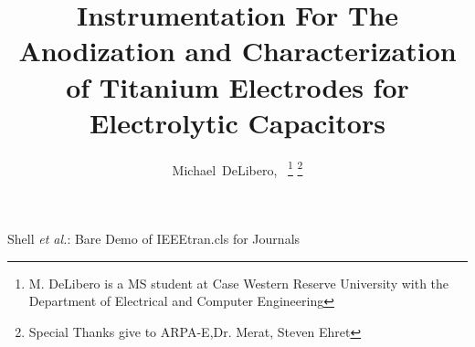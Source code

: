 \documentclass[journal]{./IEEEtran}
\begin{document}
\title{Instrumentation For The Anodization and Characterization of Titanium Electrodes for Electrolytic Capacitors}

\author{Michael~DeLibero,~%
\thanks{M. DeLibero is a MS student at Case Western Reserve University with the Department
of Electrical and Computer Engineering}%
\thanks{Special Thanks give to ARPA-E,Dr. Merat, Steven Ehret}}

% 
%



%
{Shell \MakeLowercase{\textit{et al.}}: Bare Demo of IEEEtran.cls for Journals}
% 







\end{document}
